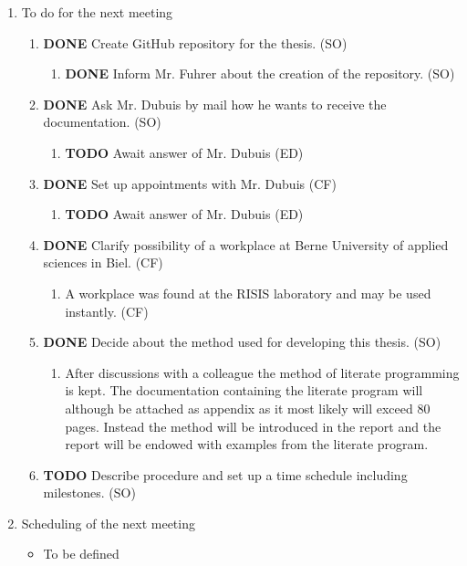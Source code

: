 \documentclass[10pt, openright, notitlepage]{scrreprt}
\begin{document}
\begin{enumerate}
\item To do for the next meeting
\label{sec:org6cc4fd1}

\begin{enumerate}
\item {\bfseries\sffamily DONE} Create GitHub repository for the thesis. (SO)
\label{sec:org09ca879}
\begin{enumerate}
\item {\bfseries\sffamily DONE} Inform Mr. Fuhrer about the creation of the repository. (SO)
\label{sec:org3e18528}
\end{enumerate}

\item {\bfseries\sffamily DONE} Ask Mr. Dubuis by mail how he wants to receive the documentation. (SO)
\label{sec:orgef90fcd}
\begin{enumerate}
\item {\bfseries\sffamily TODO} Await answer of Mr. Dubuis (ED)
\label{sec:orgbc507aa}
\end{enumerate}

\item {\bfseries\sffamily DONE} Set up appointments with Mr. Dubuis (CF)
\label{sec:org78c1ecc}
\begin{enumerate}
\item {\bfseries\sffamily TODO} Await answer of Mr. Dubuis (ED)
\label{sec:orgae84fa4}
\end{enumerate}

\item {\bfseries\sffamily DONE} Clarify possibility of a workplace at Berne University of applied sciences in Biel. (CF)
\label{sec:org2fdab57}
\begin{enumerate}
\item A workplace was found at the RISIS laboratory and may be used instantly. (CF)
\label{sec:org320804e}
\end{enumerate}

\item {\bfseries\sffamily DONE} Decide about the method used for developing this thesis. (SO)
\label{sec:orgaddbe7c}
\begin{enumerate}
\item After discussions with a colleague the method of literate programming is
\label{sec:org10d62c4}
kept. The documentation containing the literate program will although be
attached as appendix as it most likely will exceed 80 pages. Instead the
method will be introduced in the report and the report will be endowed
with examples from the literate program.
\end{enumerate}

\item {\bfseries\sffamily TODO} Describe procedure and set up a time schedule including milestones. (SO)
\label{sec:orga12ede9}
\end{enumerate}

\item Scheduling of the next meeting
\label{sec:orgca97a19}

\begin{itemize}
\item To be defined
\end{itemize}
\end{enumerate}
\end{document}
